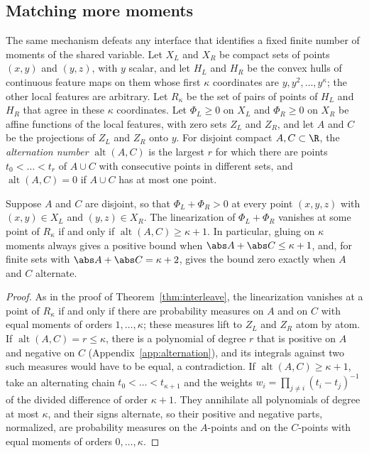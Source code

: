 \subsection{Matching more moments}\label{sec:k-moments}

The same mechanism defeats any interface that identifies a fixed finite
number of moments of the shared variable. Let $X_L$ and $X_R$ be compact
sets of points $(x,y)$ and $(y,z)$, with $y$ scalar, and let $H_L$ and $H_R$
be the convex hulls of continuous feature maps on them whose first $\kappa$
coordinates are $y,y^2,\dots,y^\kappa$; the other local features are
arbitrary. Let $R_\kappa$ be the set of pairs of points of $H_L$ and $H_R$
that agree in these $\kappa$ coordinates. Let $\Phi_L\ge0$ on $X_L$ and
$\Phi_R\ge0$ on $X_R$ be affine functions of the local features, with zero
sets $Z_L$ and $Z_R$, and let $A$ and $C$ be the projections of $Z_L$ and
$Z_R$ onto $y$. For disjoint compact $A,C\subset\R$, the \emph{alternation
number} $\operatorname{alt}(A,C)$ is the largest $r$ for which there are
points $t_0<\dots<t_r$ of $A\cup C$ with consecutive points in different
sets, and $\operatorname{alt}(A,C)=0$ if $A\cup C$ has at most one point.

\begin{theorem}[Alternation]\label{thm:alternation}
Suppose $A$ and $C$ are disjoint, so that $\Phi_L+\Phi_R>0$ at every point
$(x,y,z)$ with $(x,y)\in X_L$ and $(y,z)\in X_R$. The linearization of
$\Phi_L+\Phi_R$ vanishes at some point of $R_\kappa$ if and only if
$\operatorname{alt}(A,C)\ge\kappa+1$. In particular, gluing on $\kappa$
moments always gives a positive bound when $\abs A+\abs C\le\kappa+1$, and,
for finite sets with $\abs A+\abs C=\kappa+2$, gives the bound zero exactly
when $A$ and $C$ alternate.
\end{theorem}

\begin{proof}
As in the proof of Theorem~\ref{thm:interleave}, the linearization vanishes
at a point of $R_\kappa$ if and only if there are probability measures on
$A$ and on $C$ with equal moments of orders $1,\dots,\kappa$; these measures
lift to $Z_L$ and $Z_R$ atom by atom. If $\operatorname{alt}(A,C)=r\le\kappa$,
there is a polynomial of degree $r$ that is positive on $A$ and negative on
$C$ (Appendix~\ref{app:alternation}), and its integrals against two such
measures would have to be equal, a contradiction. If
$\operatorname{alt}(A,C)\ge\kappa+1$, take an alternating chain
$t_0<\dots<t_{\kappa+1}$ and the weights $w_i=\prod_{j\ne i}(t_i-t_j)^{-1}$
of the divided difference of order $\kappa+1$. They annihilate all
polynomials of degree at most $\kappa$, and their signs alternate, so their
positive and negative parts, normalized, are probability measures on the
$A$-points and on the $C$-points with equal moments of orders
$0,\dots,\kappa$.
\end{proof}

